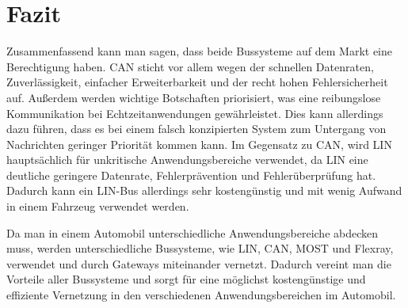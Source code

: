 
\chapter{Fazit}

Zusammenfassend kann man sagen, dass beide Bussysteme auf dem Markt eine Berechtigung haben.
CAN sticht vor allem wegen der schnellen Datenraten, Zuverlässigkeit, einfacher Erweiterbarkeit und der recht hohen Fehlersicherheit auf.
Außerdem werden wichtige Botschaften priorisiert, was eine reibungslose Kommunikation bei Echtzeitanwendungen gewährleistet. Dies kann allerdings dazu führen, dass es bei einem falsch konzipierten System zum Untergang von Nachrichten geringer Priorität kommen kann.
Im Gegensatz zu CAN, wird LIN hauptsächlich für unkritische Anwendungsbereiche verwendet, da LIN eine deutliche geringere Datenrate, Fehlerprävention und Fehlerüberprüfung hat. Dadurch kann ein LIN-Bus allerdings sehr kostengünstig und mit wenig Aufwand in einem Fahrzeug verwendet werden. 

Da man in einem Automobil unterschiedliche Anwendungsbereiche abdecken muss, werden unterschiedliche Bussysteme, wie LIN, CAN, MOST und Flexray, verwendet und durch Gateways miteinander vernetzt. 
Dadurch vereint man die Vorteile aller Bussysteme und sorgt für eine möglichst kostengünstige und effiziente Vernetzung in den verschiedenen Anwendungsbereichen im Automobil. 
